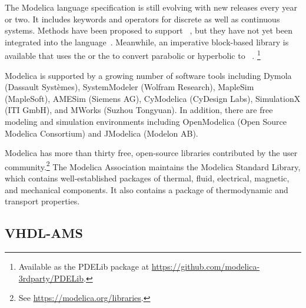 
The Modelica language specification is still evolving with new releases every year or two.  It includes keywords and operators for discrete as well as continuous systems.  Methods have been proposed to support ~\cite{Fritzson2004, Saldamli2006}, but they have not yet been integrated into the language~\cite{Modelica3.3}.  Meanwhile, an imperative block-based library is available that uses the  or the  to convert parabolic or hyperbolic  to ~\cite{Dshabarow2007, Dshabarow2008}. \footnote{Available as the PDELib package at \url{https://github.com/modelica-3rdparty/PDELib}.}




Modelica is supported by a growing number of software tools including Dymola (Dassault Syst\`emes), SystemModeler (Wolfram Research), MapleSim (MapleSoft), AMESim (Siemens AG), CyModelica (CyDesign Labs), SimulationX (ITI GmbH), and MWorks (Suzhou Tongyuan).  In addition, there are free modeling and simulation environments including OpenModelica (Open Source Modelica Consortium) and JModelica (Modelon AB).

Modelica has more than thirty free, open-source libraries contributed by the user community.\footnote{See \url{https://modelica.org/libraries}.}  The Modelica Association maintains the Modelica Standard Library, which contains well-established packages of thermal, fluid, electrical, magnetic, and mechanical components.  It also contains a package of thermodynamic and transport properties.


\subsection{VHDL-AMS}

